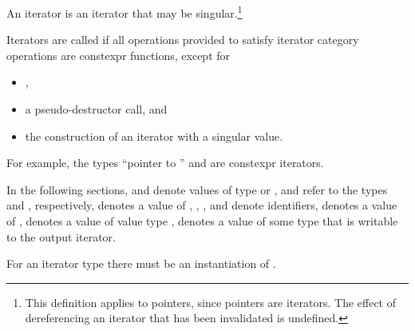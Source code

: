 \pnum
An
iterator is an iterator that may be singular.\footnote{This definition applies to pointers, since pointers are iterators.
The effect of dereferencing an iterator that has been invalidated
is undefined.
}

\pnum
{}%
Iterators are called 
if all operations provided to satisfy iterator category operations
are constexpr functions, except for
\begin{itemize}
\item {},
\item a pseudo-destructor call, and
\item the construction of an iterator with a singular value.
\end{itemize}
\begin{note}
For example, the types ``pointer to '' and
 are constexpr iterators.
\end{note}

\begin{removedblock}
\pnum
In the following sections,
and
denote values of type
 or ,
 and  refer to the
types  and
, respectively,
denotes a value of
,
,
,
and
denote identifiers,
denotes a value of
,
denotes a value of value type
,
denotes a value of some type that is writable to the output iterator.
\begin{note} For an iterator type  there must be an instantiation
of . \end{note}
\end{removedblock}

